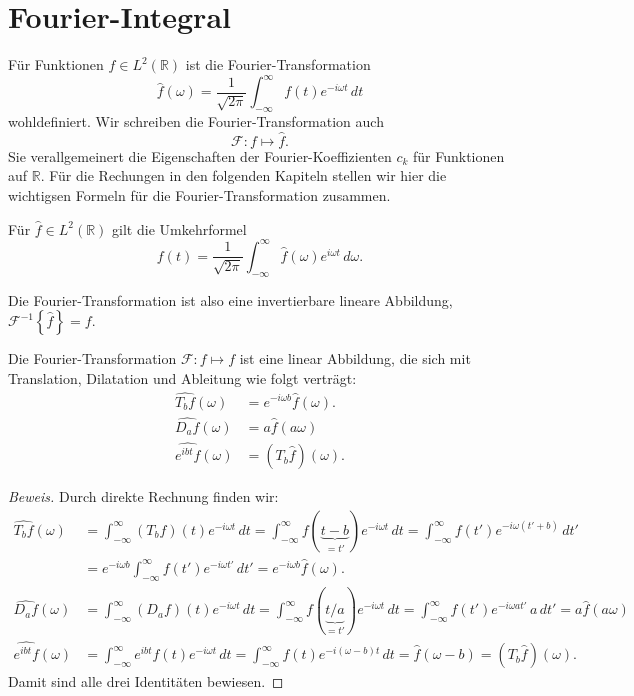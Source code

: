 %
%
%
\section{Fourier-Integral
\label{section:fourier-integral}}
Für Funktionen $f\in L^2(\mathbb R)$ ist die Fourier-Transformation
\[
\hat{f}(\omega)
=
\frac{1}{\sqrt{2\pi}}
\int_{-\infty}^\infty f(t) e^{-i\omega t}\,dt
\]
wohldefiniert.
Wir schreiben die Fourier-Transformation auch
\[
\mathcal{F}\colon f\mapsto \hat{f}.
\]
Sie verallgemeinert die Eigenschaften der Fourier-Koeffizienten $c_k$
für Funktionen auf $\mathbb R$.
Für die Rechungen in den folgenden Kapiteln stellen wir hier die
wichtigsen Formeln für die Fourier-Transformation zusammen.

\begin{satz}
Für $\hat{f}\in L^2(\mathbb R)$ gilt die Umkehrformel
\[
f(t)
=
\frac{1}{\sqrt{2\pi}}
\int_{-\infty}^{\infty} \hat{f}(\omega)e^{i\omega t}\,d\omega.
\]
\end{satz}

Die Fourier-Transformation ist also eine invertierbare lineare Abbildung,
$\mathcal{F}^{-1}\!\left\lbrace\hat{f}\right\rbrace = f$.

\begin{satz}
\label{four-int:trans-dial}
Die Fourier-Transformation $\mathcal F\colon f\mapsto f$ ist eine linear
Abbildung, die sich mit Translation, Dilatation und Ableitung wie folgt
verträgt:
\begin{align*}
\widehat{T_bf}(\omega)
&=
e^{-i\omega b}\hat{f}(\omega).
\\
\widehat{D_af}(\omega)
&=
a \hat{f}(a\omega)
\\
\widehat{e^{ibt}f}(\omega)
&=
(T_b\hat{f})(\omega).
\end{align*}
\end{satz}

\begin{proof}[Beweis]
Durch direkte Rechnung finden wir:
\begin{align*}
\widehat{T_bf}(\omega)
&=
\int_{-\infty}^{\infty} (T_bf)(t)e^{-i\omega t}\,dt
=
\int_{-\infty}^{\infty} f(\underbrace{t-b}_{\displaystyle=t'})e^{-i\omega t}\,dt
=
\int_{-\infty}^{\infty} f(t')e^{-i\omega(t'+b)}\,dt'
\\
&=
e^{-i\omega b}
\int_{-\infty}^{\infty} f(t')e^{-i\omega t'}\,dt'
=
e^{-i\omega b}\hat{f}(\omega).
\\
\widehat{D_af}(\omega)
&=
\int_{-\infty}^\infty (D_af)(t)e^{-i\omega t}\,dt
=
\int_{-\infty}^\infty f(\underbrace{t/a}_{\displaystyle=t'})e^{-i\omega t}\,dt
=
\int_{-\infty}^\infty f(t')e^{-i\omega at'}\,a\,dt'
=
a \hat{f}(a\omega)
\\
\widehat{e^{ibt}f}(\omega)
&=
\int_{-\infty}^\infty e^{ibt}f(t)e^{-i\omega t}\,dt
=
\int_{-\infty}^\infty f(t)e^{-i(\omega -b)t}\,dt
=
\hat{f}(\omega-b)
=
(T_b\hat{f})(\omega).
\end{align*}
Damit sind alle drei Identitäten bewiesen.
\end{proof}

